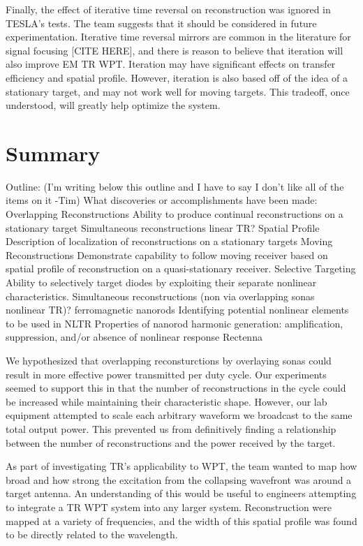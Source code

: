 Finally, the effect of iterative time reversal on reconstruction was ignored in TESLA's tests.  The team suggests that it should be considered in future experimentation. Iterative time reversal mirrors are common in the literature for signal focusing [CITE HERE], and there is reason to believe that iteration will also improve EM TR WPT.  Iteration may have significant effects on transfer efficiency and spatial profile.  However, iteration is also based off of the idea of a stationary target, and may not work well for moving targets.  This tradeoff, once understood, will greatly help optimize the system.

\section{Summary}

Outline: (I'm writing below this outline and I have to say I don't like all of the items on it -Tim)
	What discoveries or accomplishments have been made:
Overlapping Reconstructions
Ability to produce continual reconstructions on a stationary target
Simultaneous reconstructions {linear TR}?
Spatial Profile
Description of localization of reconstructions on a stationary targets
Moving Reconstructions
Demonstrate capability to follow moving receiver based on spatial profile of reconstruction on a quasi-stationary receiver.
Selective Targeting
Ability to selectively target diodes by exploiting their separate nonlinear characteristics.
Simultaneous reconstructions (non via overlapping sonas {nonlinear TR})?
ferromagnetic nanorods
Identifying potential nonlinear elements to be used in NLTR
Properties of nanorod harmonic generation: amplification, suppression, and/or absence of nonlinear response
Rectenna

We hypothesized that overlapping reconsturctions by overlaying sonas could result in more effective power transmitted per duty cycle. Our experiments seemed to support this in that the number of reconstructions in the cycle could be increased while maintaining their characteristic shape. However, our lab equipment attempted to scale each arbitrary waveform we broadcast to the same total output power. This prevented us from definitively finding a relationship between the number of reconstructions and the power received by the target.

As part of investigating TR's applicability to WPT, the team wanted to map how broad and how strong the excitation from the collapsing wavefront was around a target antenna. An understanding of this would be useful to engineers attempting to integrate a TR WPT system into any larger system. Reconstruction were mapped at a variety of frequencies, and the width of this spatial profile was found to be directly related to the wavelength.

